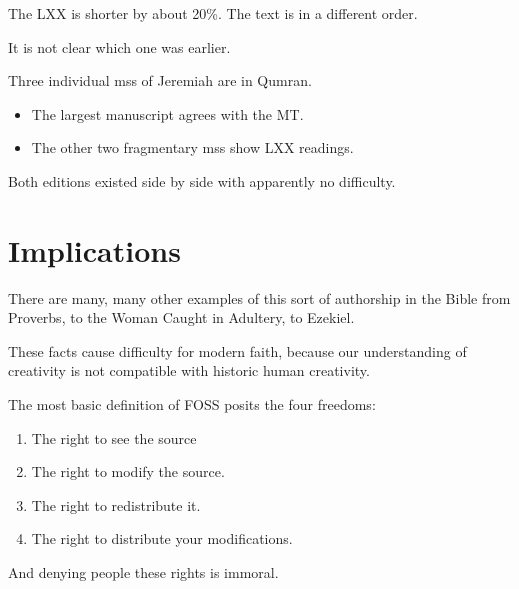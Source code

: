 \documentclass{beamer}
\begin{document}
\begin{frame}
  The LXX is shorter by about 20\%. The text is in a different order.
\end{frame}

\begin{frame}
  It is not clear which one was earlier.
\end{frame}

\begin{frame}
  Three individual mss of Jeremiah are in Qumran.\pause
  \begin{itemize}
	\item The largest manuscript agrees with the MT.\pause
	\item The other two fragmentary mss show LXX readings.
  \end{itemize}
\end{frame}

\begin{frame}
  Both editions existed side by side with apparently no difficulty.
\end{frame}

\section{Implications}

\begin{frame}
  There are many, many other examples of this sort of authorship in the Bible from Proverbs, to the Woman Caught in Adultery, to Ezekiel.
\end{frame}

\begin{frame}
  These facts cause difficulty for modern faith, because our understanding of creativity is not compatible with historic human creativity.
\end{frame}

\begin{frame}
  The most basic definition of FOSS posits the four freedoms:\pause
  \begin{enumerate}
	\item The right to see the source\pause
	\item The right to modify the source.\pause
	\item The right to redistribute it.\pause
	\item The right to distribute your modifications.\pause
  \end{enumerate}
  And denying people these rights is immoral.
\end{frame}
\end{document}
